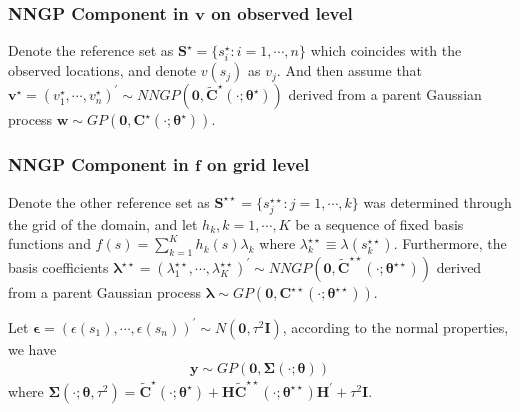 \documentclass[
12pt, %
a4paper, %
oneside, %
headinclude,footinclude, %
BCOR5mm, %
]{scrartcl}
\begin{document}
\subsubsection{NNGP Component in $\boldsymbol{v}$ on observed level}
Denote the reference set as $\boldsymbol{S}^{\star} = \{s_i^{\star}: i = 1, \cdots, n\}$ which coincides with the observed locations, and denote $v(s_j)$ as $v_j$. 
And then assume that $\boldsymbol{v}^{\star} = \left(v_1^{\star}, \cdots, v_n^{\star}\right)^\prime \sim NNGP\left(\boldsymbol{0}, \boldsymbol{\tilde{C}^{\star}}(\cdot; \boldsymbol{\theta}^{\star})\right)$ derived from a parent Gaussian process $\boldsymbol{w} \sim GP\left(\boldsymbol{0}, \boldsymbol{{C}^{\star}}(\cdot; \boldsymbol{\theta}^{\star})\right)$.

\subsubsection{NNGP Component in $\boldsymbol{f}$ on grid level}
Denote the other reference set as $\boldsymbol{S}^{\star\star} = \{s_j^{\star\star}: j = 1, \cdots, k\}$ was determined through the grid of the domain, and 
let $h_{k}, k = 1, \cdots, K$ be a sequence of fixed basis functions and $f(s) = \sum_{k = 1}^{K}h_{k}(s)\lambda_{k}$ where $\lambda_{k}^{\star\star} \equiv \lambda(s_k^{\star\star})$. Furthermore, the basis coefficients $\boldsymbol{\lambda}^{\star\star} = \left(\lambda_1^{\star\star}, \cdots, \lambda_K^{\star\star}\right)^\prime \sim NNGP\left(\boldsymbol{0}, \boldsymbol{\tilde{C}}^{\star\star}(\cdot; \boldsymbol{\theta}^{\star\star})\right)$ derived from a parent Gaussian process $\boldsymbol{\lambda} \sim GP\left(\boldsymbol{0}, \boldsymbol{{C}^{\star\star}}(\cdot; \boldsymbol{\theta}^{\star\star})\right)$.

Let 
$\boldsymbol{\epsilon} = \left(\epsilon(s_1), \cdots, \epsilon(s_n)\right)^\prime \sim N(\boldsymbol{0}, \tau^2\boldsymbol{I})$, according to the normal properties, we have
\begin{equation}
\begin{aligned}
\boldsymbol{y} \sim GP\left(\boldsymbol{0}, \boldsymbol{\Sigma}(\cdot; \boldsymbol{\theta})\right)
\end{aligned} \label{DP1}
\end{equation}
where $\boldsymbol{\Sigma}(\cdot; \boldsymbol{\theta}, \tau^2) = \boldsymbol{\tilde{C}}^{\star}(\cdot; \boldsymbol{\theta}^{\star}) +
\boldsymbol{H}\boldsymbol{\tilde{C}}^{\star\star}(\cdot; \boldsymbol{\theta}^{\star\star})\boldsymbol{H}^\prime + \tau^2\boldsymbol{I}.$
\end{document}
